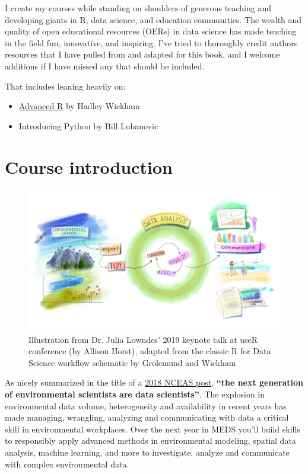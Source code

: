 \documentclass[
]{book}
\providecommand{\tightlist}{%
  \setlength{\itemsep}{0pt}\setlength{\parskip}{0pt}}
\begin{document}
I create my courses while standing on shoulders of generous teaching and developing giants in R, data science, and education communities. The wealth and quality of open educational resources (OERs) in data science has made teaching in the field fun, innovative, and inspiring. I've tried to thoroughly credit authors resources that I have pulled from and adapted for this book, and I welcome additions if I have missed any that should be included.

That includes leaning heavily on:

\begin{itemize}
\tightlist
\item
  \href{http://adv-r.had.co.nz/}{Advanced R} by Hadley Wickham \citep{wickham_advanced_2019}
\item
  Introducing Python by Bill Lubanovic \citep{lubanovic_introducing_2014}
\end{itemize}

\hypertarget{course-introduction}{%
\section{Course introduction}\label{course-introduction}}

\begin{figure}

{\centering \includegraphics[width=1\linewidth]{images/eds_r4ds} 

}

\caption{Illustration from Dr. Julia Lowndes' 2019 keynote talk at useR conference (by Allison Horst), adapted from the classic R for Data Science workflow schematic by Grolemund and Wickham}\label{fig:unnamed-chunk-1}
\end{figure}

As nicely summarized in the title of a \href{https://www.nceas.ucsb.edu/news/next-generation-environmental-scientists-are-data-scientists}{2018 NCEAS post}, \textbf{``the next generation of environmental scientists are data scientists''}. The explosion in environmental data volume, heterogeneity and availability in recent years has made managing, wrangling, analyzing and communicating with data a critical skill in environmental workplaces. Over the next year in MEDS you'll build skills to responsibly apply advanced methods in environmental modeling, spatial data analysis, machine learning, and more to investigate, analyze and communicate with complex environmental data.
\end{document}
